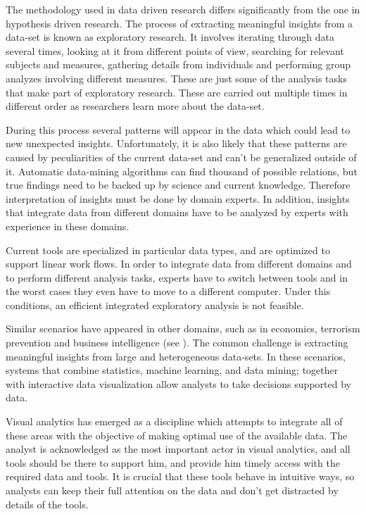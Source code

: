 \documentclass[utf8,paper]{frontiersSCNS} %
\begin{document}
The methodology used in data driven research differs significantly from the one in hypothesis driven research. The process of extracting meaningful insights from a data-set is known as exploratory research. It involves iterating through data several times, looking at it from different points of view, searching for relevant subjects and measures, gathering details from individuals and performing group analyzes involving different measures. These are just some of the analysis tasks that make part of exploratory research. These are carried out multiple times in different order as researchers learn more about the data-set. 

During this process several patterns will appear in the data which could lead to new unexpected insights. Unfortunately, it is also likely that these patterns are caused by peculiarities of the current data-set and can't be generalized outside of it. Automatic data-mining algorithms can find thousand of possible relations, but true findings need to be backed up by science and current knowledge. Therefore interpretation of insights must be done by domain experts. In addition, insights that integrate data from different domains have to be analyzed by experts with experience in these domains. 

Current tools are specialized in particular data types, and are optimized to support linear work flows. In order to integrate data from different domains and to perform different analysis tasks, experts have to switch between tools  and in the worst cases they even have to move to a different computer. Under this conditions, an efficient integrated exploratory analysis is not feasible. 

					
Similar scenarios have appeared in other domains, such as in economics, terrorism prevention and business intelligence (see \cite{cook_illuminating_2005}). The common challenge is extracting meaningful insights from large and heterogeneous data-sets. In these scenarios, systems that combine statistics, machine learning, and data mining; together with interactive data visualization allow analysts to take decisions supported by data. 

Visual analytics \citep{keim_visual_2008} has emerged as a discipline which attempts to integrate all of these areas with the objective of making optimal use of the available data. The analyst is acknowledged as the most important actor in visual analytics, and all tools should be there to support him, and provide him timely access with the required data and tools. It is crucial that these tools behave in intuitive ways, so analysts can keep their full attention on the data and don't get distracted by details of the tools. 
					
\end{document}
